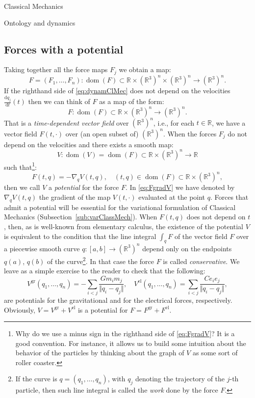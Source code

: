 \documentclass[oneside,a4paper,11pt]{amsbook}
\newcommand{\R}{\mathds R}
\newcommand{\dd}{\mathrm d}
\DeclareMathOperator{\Dom}{dom}
\theoremstyle{remark}\newtheorem{exercise}{Exercise}[chapter]
\theoremstyle{plain}\newtheorem{teo}{Theorem}[section]
\theoremstyle{plain}\newtheorem{lem}[teo]{Lemma}
\theoremstyle{plain}\newtheorem{prop}[teo]{Proposition}
\theoremstyle{plain}\newtheorem{cor}[teo]{Corollary}
\theoremstyle{definition}\newtheorem{defin}[teo]{Definition}
\theoremstyle{remark}\newtheorem{rem}[teo]{Remark}
\theoremstyle{definition}\newtheorem{notation}[teo]{Notation}
\theoremstyle{definition}\newtheorem{convention}[teo]{Convention}
\theoremstyle{definition}\newtheorem{example}[teo]{Example}
\numberwithin{section}{chapter}
\numberwithin{equation}{section}
\begin{document}
\begin{chapter}{Classical Mechanics}
\begin{section}{Ontology and dynamics}
\subsection{Forces with a potential}
\label{sub:potential}

Taking together all the force maps $F_j$ we obtain a map:
\[F=(F_1,\ldots,F_n):\Dom(F)\subset\R\times(\R^3)^n\times(\R^3)^n\longrightarrow(\R^3)^n.\]
If the righthand side of \eqref{eq:dynamClMec} does not depend on the velocities $\frac{\dd q_j}{\dd t}(t)$ then
we can think of $F$ as a map of the form:
\[F:\Dom(F)\subset\R\times(\R^3)^n\longrightarrow(\R^3)^n.\]
That is a {\em time-dependent vector field\/} over $(\R^3)^n$, i.e., for each $t\in\R$, we have a vector field
$F(t,\cdot)$ over (an open subset of) $(\R^3)^n$. When the forces $F_j$ do not depend on the velocities and
there exists a smooth map:
\[V:\Dom(V)=\Dom(F)\subset\R\times(\R^3)^n\longrightarrow\R\]
such that\footnote{%
Why do we use a minus sign in the righthand side of \eqref{eq:FgradV}? It is a good convention. For instance,
it allows us to build some intuition about the behavior of the particles by thinking about the graph of $V$ as some
sort of roller coaster.}:
\begin{equation}\label{eq:FgradV}
F(t,q)=-\nabla_qV(t,q),\quad(t,q)\in\Dom(F)\subset\R\times(\R^3)^n,
\end{equation}
then we call $V$ a {\em potential\/} for the force $F$. In \eqref{eq:FgradV} we have denoted by
$\nabla_qV(t,q)$ the gradient of the map $V(t,\cdot)$ evaluated at the point $q$. Forces that admit a potential
will be essential for the variational formulation of Classical Mechanics (Subsection~\ref{sub:varClassMech}).
When $F(t,q)$ does not depend on $t$, then, as is well-known from elementary calculus, the existence of the potential
$V$ is equivalent to the condition that the line integral $\int_qF$ of the vector field $F$ over a piecewise
smooth curve $q:[a,b]\to(\R^3)^n$ depend only on the endpoints $q(a)$, $q(b)$ of the curve\footnote{%
If the curve is $q=(q_1,\ldots,q_n)$, with $q_j$ denoting the trajectory of the $j$-th particle, then such
line integral is called the {\em work\/} done by the force $F$.}. In that case the force $F$ is called
{\em conservative}. We leave as a simple exercise to the reader to check that the following:
\[V^{\mathrm{gr}}(q_1,\ldots,q_n)=-\sum_{i<j}\frac{Gm_im_j}{\Vert q_i-q_j\Vert},\quad
V^{\mathrm{el}}(q_1,\ldots,q_n)=\sum_{i<j}\frac{Ce_ie_j}{\Vert q_i-q_j\Vert},\]
are potentials for the gravitational and for the electrical forces, respectively.
Obviously, $V=V^{\mathrm{gr}}+V^{\mathrm{el}}$ is a potential for $F=F^{\mathrm{gr}}+F^{\mathrm{el}}$.


\end{section}
\end{chapter}
\end{document}
